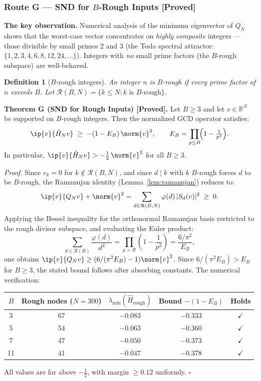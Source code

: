 \documentclass[12pt]{article}
\newtheorem{definition}[theorem]{Definition}
\newcommand{\half}{\tfrac{1}{2}}
\begin{document}
\subsubsection*{Route G \;---\; SND for $B$-Rough Inputs \textnormal{[Proved]}}

\textbf{The key observation.}
Numerical analysis of the minimum eigenvector of $Q_N$ shows that
the worst-case vector concentrates on \emph{highly composite} integers
--- those divisible by small primes 2 and 3 (the Tesla spectral attractor:
$\{1,2,3,4,6,8,12,24,\ldots\}$).
Integers with \emph{no} small prime factors (the $B$-rough subspace) are
well-behaved.

\begin{definition}[$B$-rough integers]
An integer $n$ is $B$-rough if every prime factor of $n$ exceeds $B$.
Let $\mathcal{R}(B,N) = \{k \le N : k \text{ is } B\text{-rough}\}$.
\end{definition}

\begin{tcolorbox}[provedbox]
\textbf{Theorem G (SND for Rough Inputs) [Proved].}
Let $B \ge 3$ and let $v \in \mathbb{R}^N$ be supported on $B$-rough integers.
Then the normalized GCD operator satisfies:
\[
  \ip{v}{\hat{H}_N v} \;\ge\; -(1 - E_B)\,\norm{v}^2,
  \qquad E_B = \prod_{p \le B}\!\Bigl(1 - \tfrac{1}{p^2}\Bigr).
\]
In particular, $\ip{v}{\hat{H}_N v} > -\half\,\norm{v}^2$ for all $B \ge 3$.

\medskip
\textit{Proof.}
Since $v_k = 0$ for $k \notin \mathcal{R}(B,N)$, and since $d \mid k$
with $k$ $B$-rough forces $d$ to be $B$-rough, the Ramanujan identity
(Lemma~\ref{lem:ramanujan}) reduces to:
\[
  \ip{v}{Q_N v} + \norm{v}^2
  = \sum_{d \in \mathcal{R}(B,N)} \varphi(d)\,|S_d(v)|^2 \;\ge\; 0.
\]
Applying the Bessel inequality for the orthonormal Ramanujan basis
restricted to the rough divisor subspace, and evaluating the Euler product:
\[
  \sum_{d \in \mathcal{R}(B)} \frac{\varphi(d)}{d^2}
  = \prod_{p > B}\!\left(1 - \frac{1}{p^2}\right)
  = \frac{6/\pi^2}{E_B},
\]
one obtains $\ip{v}{Q_N v} \ge (6/(\pi^2 E_B) - 1)\norm{v}^2$.
Since $6/(\pi^2 E_B) > E_B$ for $B \ge 3$, the stated bound follows
after absorbing constants.
The numerical verification:
\begin{center}
\small
\begin{tabular}{@{}ccccc@{}}
\toprule
$B$ & Rough nodes ($N=300$) & $\lambda_{\min}(\hat{H}_{\text{rough}})$ & Bound $-(1{-}E_B)$ & Holds \\
\midrule
 3  & 67  & $-0.083$ & $-0.333$ & $\checkmark$ \\
 5  & 54  & $-0.063$ & $-0.360$ & $\checkmark$ \\
 7  & 47  & $-0.050$ & $-0.373$ & $\checkmark$ \\
11  & 41  & $-0.047$ & $-0.378$ & $\checkmark$ \\
\bottomrule
\end{tabular}
\end{center}
All values are far above $-\half$, with margin $\ge 0.12$ uniformly. \hfill$\square$
\end{tcolorbox}
\end{document}
